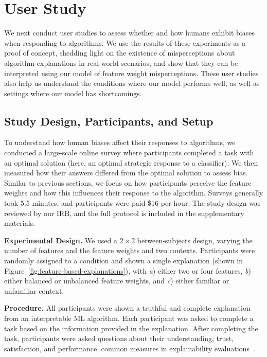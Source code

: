 \section{User Study}\label{sec:user-study}
{We next conduct user studies to assess whether and how humans exhibit biases when responding to algorithms. We use the results of these experiments as a proof of concept, shedding light on the existence of misperceptions about algorithm explanations in real-world scenarios, and show that they can be interpreted using our model of feature weight misperceptions. These user studies also help us understand the conditions where our model performs well, as well as settings where our model has shortcomings.}

\subsection{Study Design, Participants, and Setup}\label{sec:study-design}
To understand how human biases affect their responses to algorithms, we conducted a large-scale online survey where participants completed a task with an optimal solution (here, an optimal strategic response to a classifier). We then measured how their answers differed from the optimal solution to assess bias. Similar to previous sections, we focus on how participants perceive the feature weights and how this influences their response to the algorithm. Surveys generally took {5.5} minutes, and participants were paid {\$16 per hour}. The study design was reviewed by our IRB, and the full protocol is included in the supplementary materials. 

\noindent\textbf{Experimental Design.} We used a $2\times2$ between-subjects design, varying the number of features and the feature weights and two contexts. Participants were randomly assigned to a condition and shown a single explanation (shown in Figure~\ref{fig:feature-based-explanations}), with \textit{a}) either two or four features, \textit{b}) either balanced or unbalanced feature weights, and \textit{c}) either familiar or unfamiliar context. 

\noindent\textbf{Procedure.} All participants were shown a truthful and complete explanation from an interpretable ML algorithm. Each participant was asked to complete a task based on the information provided in the explanation. After completing the task, participants were asked questions about their understanding, trust, satisfaction, and performance, common measures in explainability evaluations~\cite{mohseni2021survey}. 

